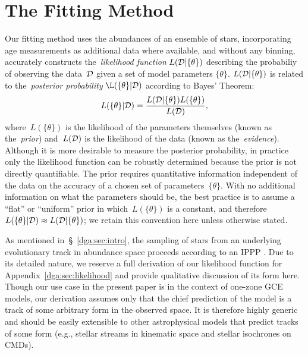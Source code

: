 
\section{The Fitting Method}
\label{dga:sec:fitting}

Our fitting method uses the abundances of an ensemble of stars, incorporating
age measurements as additional data where available, and without any binning,
accurately constructs the~\textit{likelihood function}
$L(\mathcal{D} | \{\theta\})$ describing the probabiliy of observing the
data~$\mathcal{D}$ given a set of model parameters $\{\theta\}$.
$L(\mathcal{D} | \{\theta\})$ is related to the~\textit{posterior probability}
$\L(\{\theta\} | \script{D})$ according to Bayes' Theorem:
\begin{equation}
L(\{\theta\} | \mathcal{D}) = \frac{
	L(\mathcal{D} | \{\theta\}) L(\{\theta\})
}{
	L(\mathcal{D})
},
\label{dga:eq:bayes}
\end{equation}
where~$L(\{\theta\})$ is the likelihood of the parameters themselves (known as
the~\textit{prior}) and~$L(\mathcal{D})$ is the likelihood of the data (known as
the~\textit{evidence}).
Although it is more desirable to measure the posterior probability, in practice
only the likelihood function can be robustly determined because the prior is
not directly quantifiable.
The prior requires quantitative information independent of the data on the
accuracy of a chosen set of parameters~$\{\theta\}$.
With no additional information on what the parameters should be, the best
practice is to assume a ``flat'' or ``uniform'' prior in which~$L(\{\theta\})$
is a constant, and therefore~$L(\{\theta\} | \mathcal{D}) \approx
L(\mathcal{D} | \{\theta\})$; we retain this convention here unless otherwise
stated.
\par
As mentioned in~\S~\ref{dga:sec:intro}, the sampling of stars from an underlying
evolutionary track in abundance space proceeds according to an IPPP
\citep[e.g.,][]{Press2007}.
Due to its detailed nature, we reserve a full derivation of our likelihood
function for Appendix~\ref{dga:sec:likelihood} and provide qualitative discussion
of its form here.
Though our use case in the present paper is in the context of one-zone GCE
models, our derivation assumes only that the chief prediction of the model is
a track of some arbitrary form in the observed space.
It is therefore highly generic and should be easily extensible to other
astrophysical models that predict tracks of some form (e.g., stellar streams
in kinematic space and stellar isochrones on CMDs).
\par
